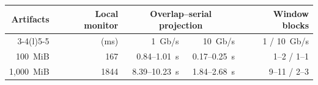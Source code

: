 \begin{tabular}{@{}rrrrr@{}}
\toprule
Artifacts & Local monitor & \multicolumn{2}{c}{Overlap--serial projection} & Window blocks \\
\cmidrule(lr){3-4}\cmidrule(l){5-5}
 & (ms) & 1~Gb/s & 10~Gb/s & 1 / 10~Gb/s \\
\midrule
100~MiB & 167 & 0.84--1.01~s & 0.17--0.25~s & 1--2 / 1--1 \\
1{,}000~MiB & 1844 & 8.39--10.23~s & 1.84--2.68~s & 9--11 / 2--3 \\
\bottomrule
\end{tabular}
